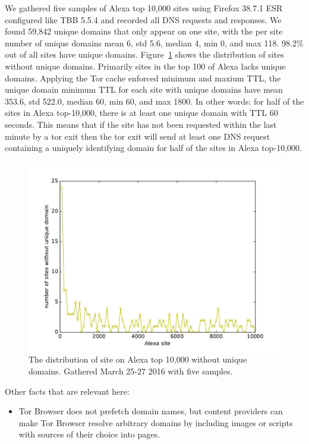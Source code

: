 We gathered five samples of Alexa top 10,000 sites using Firefox 38.7.1 ESR
configured like TBB 5.5.4 and recorded all DNS requests and responses.
We found 59,842 unique domains that only appear on one site, with the per site
number of unique domains mean 6, std 5.6, median 4, min 0, and max 118.
98.2\% out of all sites have unique domains.
Figure~\ref{fig:dns-unique-domains-ff} shows the distribution of sites
without unique domains. Primarily sites in the top 100 of Alexa lacks unique
domains. Applying the Tor cache enforced minimum and maxium TTL, the unique
domain minimum TTL for each site with unique domains have mean 353.6, std 522.0,
median 60, min 60, and max 1800. In other words: for half of the sites in
Alexa top-10,000, there is at least one unique domain with TTL 60 seconds.
This means that if the site has not been requested within the last minute
by a tor exit then the tor exit will send at least one DNS request containing
a uniquely identifying domain for half of the sites in Alexa top-10,000.

\begin{figure}[t]
	\centering
	\includegraphics[width=\linewidth]{figures/dns-unique-domains}
	\caption{The distribution of site on Alexa top 10,000 without unique domains.
	Gathered March 25-27 2016 with five samples.}
	\label{fig:dns-unique-domains-ff}
\end{figure}

Other facts that are relevant here:
\begin{itemize}
	\item Tor Browser does not prefetch domain names, but content providers can
	make Tor Browser resolve arbitrary domains by including images or scripts
	with sources of their choice into pages. 
\end{itemize}
